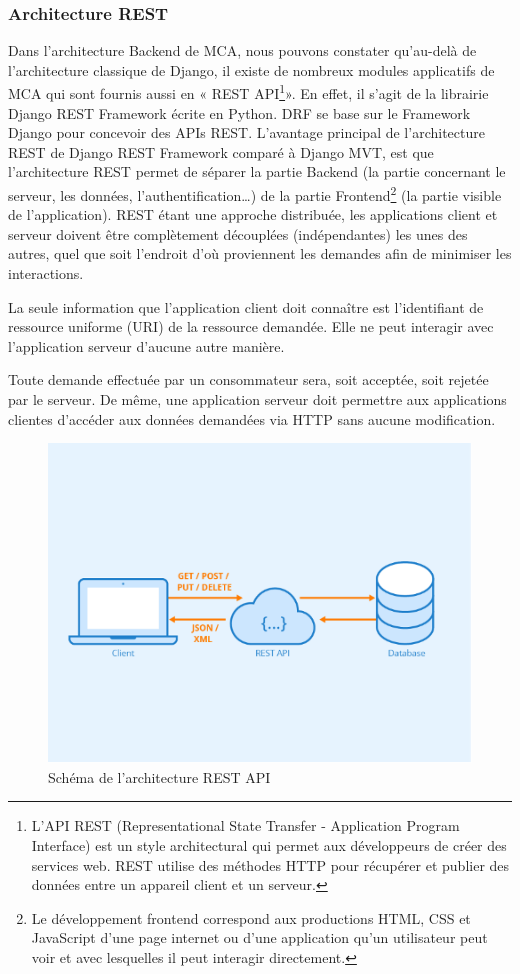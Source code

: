 \subsubsection{Architecture REST}
Dans l’architecture Backend de MCA, nous pouvons constater qu’au-delà de l’architecture classique de Django, 
il existe de nombreux modules applicatifs de MCA qui sont fournis aussi en « REST API\footnote[7]{L'API REST 
(Representational State Transfer - Application Program Interface) est un style architectural qui permet 
aux développeurs de créer des services web. REST utilise des méthodes HTTP pour récupérer et publier des 
données entre un appareil client et un serveur.}». 
En effet, il s’agit de la librairie Django REST Framework écrite en Python. 
DRF se base sur le Framework Django pour concevoir des APIs REST. L’avantage principal de l’architecture 
REST de Django REST Framework comparé à Django MVT, est que l’architecture REST permet de séparer la partie 
Backend (la partie concernant le serveur, les données, l’authentification…) de la partie Frontend\footnote[8]{Le développement frontend correspond aux productions HTML, CSS et JavaScript 
d’une page internet ou d’une application qu’un utilisateur peut voir et avec lesquelles il peut interagir 
directement.} (la partie visible de l’application).
REST étant une approche distribuée, les applications client et serveur doivent être complètement découplées 
(indépendantes) les unes des autres, quel que soit l'endroit d'où proviennent les demandes afin de minimiser 
les interactions.

La seule information que l'application client doit connaître est l'identifiant de ressource uniforme (URI) 
de la ressource demandée. Elle ne peut interagir avec l'application serveur d'aucune autre manière.

Toute demande effectuée par un consommateur sera, soit acceptée, soit rejetée par le serveur. De même, 
une application serveur doit permettre aux applications clientes d'accéder aux données demandées via 
HTTP sans aucune modification.

\begin{figure}[hp]
    \centering
    \includegraphics{images/arch_rest.png}
    \caption{Schéma de l'architecture REST API}
\end{figure}

